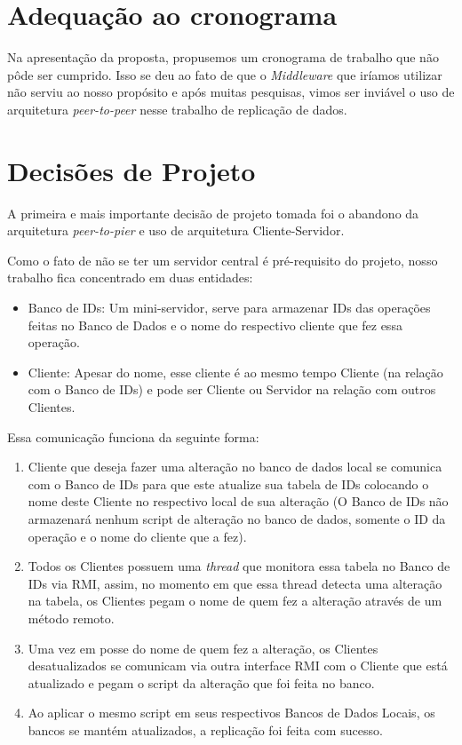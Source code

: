 \documentclass[brazil, a4paper,12pt]{article}
\begin{document}
\section{Adequação ao cronograma}
Na apresentação da proposta, propusemos um cronograma de trabalho que não pôde ser cumprido. Isso se deu ao fato de que o \emph{Middleware} que iríamos utilizar não serviu ao nosso propósito e após muitas pesquisas, vimos ser inviável o uso de arquitetura \emph{peer-to-peer} nesse trabalho de replicação de dados.

\section{Decisões de Projeto}
A primeira e mais importante decisão de projeto tomada foi o abandono da arquitetura \emph{peer-to-pier} e uso de arquitetura Cliente-Servidor. 

Como o fato de não se ter um servidor central é pré-requisito do projeto, nosso trabalho fica concentrado em duas entidades:
\begin{itemize}
\item Banco de IDs: Um mini-servidor, serve para armazenar IDs das operações feitas no Banco de Dados e o nome do respectivo cliente que fez essa operação.
\item Cliente: Apesar do nome, esse cliente é ao mesmo tempo Cliente (na relação com o Banco de IDs) e pode ser Cliente ou Servidor na relação com outros Clientes.
\end{itemize}

Essa comunicação funciona da seguinte forma: 
\begin{enumerate}
\item Cliente que deseja fazer uma alteração no banco de dados local se comunica com o Banco de IDs para que este atualize sua tabela de IDs colocando o nome deste Cliente no respectivo local de sua alteração (O Banco de IDs não armazenará nenhum script de alteração no banco de dados, somente o ID da operação e o nome do cliente que a fez).
\item Todos os Clientes possuem uma \emph{thread} que monitora essa tabela no Banco de IDs via RMI, assim, no momento em que essa thread detecta uma alteração na tabela, os Clientes pegam o nome de quem fez a alteração através de um método remoto.
\item Uma vez em posse do nome de quem fez a alteração, os Clientes desatualizados se comunicam via outra interface RMI com o Cliente que está atualizado e pegam o script da alteração que foi feita no banco.
\item Ao aplicar o mesmo script em seus respectivos Bancos de Dados Locais, os bancos se mantém atualizados, a replicação foi feita com sucesso.
\end{enumerate}
\end{document}

